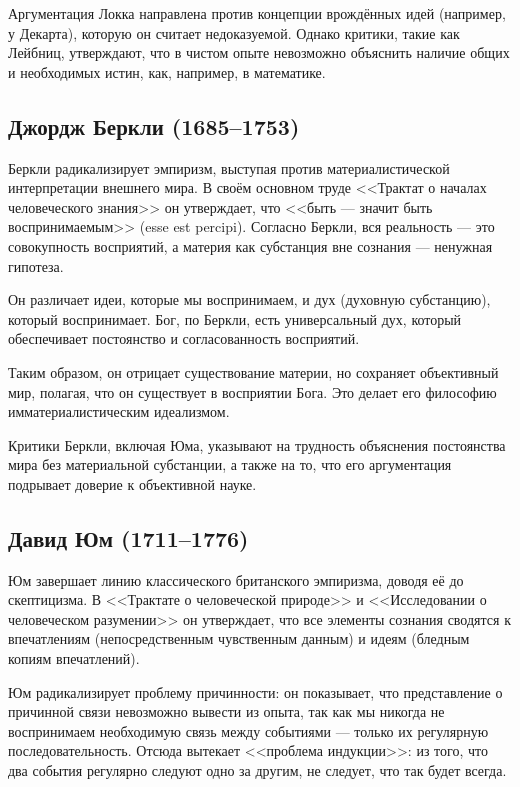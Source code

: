 \documentclass[12pt,a4paper]{article}
\begin{document}
	Аргументация Локка направлена против концепции врождённых идей (например, у Декарта), которую он считает недоказуемой. Однако критики, такие как Лейбниц, утверждают, что в чистом опыте невозможно объяснить наличие общих и необходимых истин, как, например, в математике.
	
	\subsection{Джордж Беркли (1685–1753)}
	
	Беркли радикализирует эмпиризм, выступая против материалистической интерпретации внешнего мира. В своём основном труде <<Трактат о началах человеческого знания>> он утверждает, что <<быть — значит быть воспринимаемым>> (esse est percipi). Согласно Беркли, вся реальность — это совокупность восприятий, а материя как субстанция вне сознания — ненужная гипотеза.
	
	Он различает идеи, которые мы воспринимаем, и дух (духовную субстанцию), который воспринимает. Бог, по Беркли, есть универсальный дух, который обеспечивает постоянство и согласованность восприятий.
	
	Таким образом, он отрицает существование материи, но сохраняет объективный мир, полагая, что он существует в восприятии Бога. Это делает его философию имматериалистическим идеализмом.
	
	Критики Беркли, включая Юма, указывают на трудность объяснения постоянства мира без материальной субстанции, а также на то, что его аргументация подрывает доверие к объективной науке.
	
	\subsection{Давид Юм (1711–1776)}
	Юм завершает линию классического британского эмпиризма, доводя её до скептицизма. В <<Трактате о человеческой природе>> и <<Исследовании о человеческом разумении>> он утверждает, что все элементы сознания сводятся к впечатлениям (непосредственным чувственным данным) и идеям (бледным копиям впечатлений).
	
	Юм радикализирует проблему причинности: он показывает, что представление о причинной связи невозможно вывести из опыта, так как мы никогда не воспринимаем необходимую связь между событиями — только их регулярную последовательность. Отсюда вытекает <<проблема индукции>>: из того, что два события регулярно следуют одно за другим, не следует, что так будет всегда.
	
\end{document}
